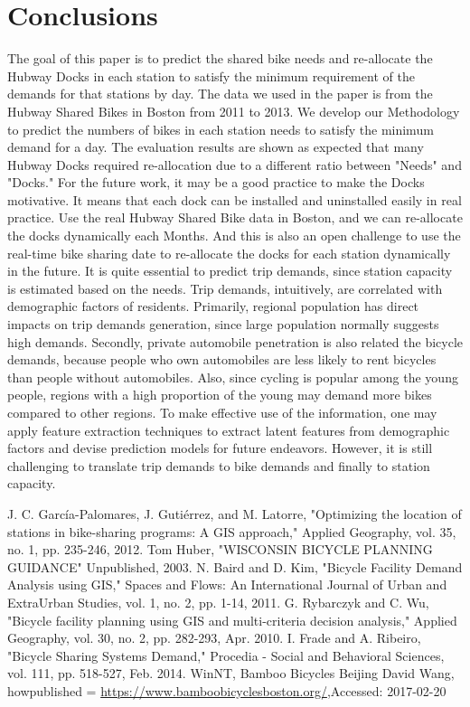 \documentclass[journal, letterpaper]{IEEEtran}
\begin{document}
\section{Conclusions}
\large
The goal of this paper is to predict the shared bike needs and re-allocate the Hubway Docks in each station to satisfy the minimum requirement of the demands for that stations by day. The data we used in the paper is from the Hubway Shared Bikes in Boston from 2011 to 2013.  We develop our Methodology to predict the numbers of bikes in each station needs to satisfy the minimum demand for a day. The evaluation results are shown as expected that many Hubway Docks required re-allocation due to a different ratio between "Needs" and "Docks." For the future work, it may be a good practice to make the Docks motivative. It means that each dock can be installed and uninstalled easily in real practice. Use the real Hubway Shared Bike data in Boston, and we can re-allocate the docks dynamically each Months. And this is also an open challenge to use the real-time bike sharing date to re-allocate the docks for each station dynamically in the future. It is quite essential to predict trip demands, since station capacity is estimated based on the needs. Trip demands, intuitively, are correlated with demographic factors of residents. Primarily, regional population has direct impacts on trip demands generation, since large population normally suggests high demands. Secondly, private automobile penetration is also related the bicycle demands, because people who own automobiles are less likely to rent bicycles than people without automobiles. Also, since cycling is popular among the young people, regions with a high proportion of the young may demand more bikes compared to other regions. To make effective use of the information, one may apply feature extraction techniques to extract latent features from demographic factors and devise prediction models for future endeavors. However, it is still challenging to translate trip demands to bike demands and finally to station capacity. 

\begin{thebibliography}{99}
\large
{} J. C. García-Palomares, J. Gutiérrez, and M. Latorre, "Optimizing the location of stations in bike-sharing programs: A GIS approach," Applied Geography, vol. 35, no. 1, pp. 235-246, 2012.
 Tom Huber, "WISCONSIN BICYCLE PLANNING GUIDANCE" Unpublished, 2003.
 N. Baird and D. Kim, "Bicycle Facility Demand Analysis using GIS," Spaces and Flows: An International Journal of Urban and ExtraUrban Studies, vol. 1, no. 2, pp. 1-14, 2011.
 G. Rybarczyk and C. Wu, "Bicycle facility planning using GIS and multi-criteria decision analysis," Applied Geography, vol. 30, no. 2, pp. 282-293, Apr. 2010.
 I. Frade and A. Ribeiro, "Bicycle Sharing Systems Demand," Procedia - Social and Behavioral Sciences, vol. 111, pp. 518-527, Feb. 2014.
 {WinNT, {{ Bamboo Bicycles Beijing} David Wang}, howpublished = {\url{https://www.bamboobicyclesboston.org/}},{Accessed: 2017-02-20}}

\end{thebibliography}
\end{document}
